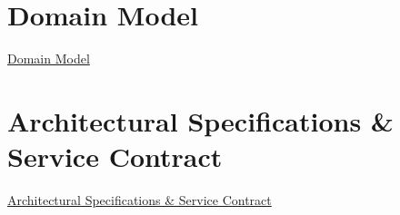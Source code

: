 \documentclass[12pt]{article}
\begin{document}
\section{Domain Model}
    \href{https://github.com/COS301-SE-2025/Marito/blob/main/Documentation/Domain%20Model/domain_model_V1.2.0.jpg}{Domain Model}

\section{Architectural Specifications \& Service Contract}
    \href{https://github.com/COS301-SE-2025/Marito/blob/main/Documentation/System%20Requirements/Architectural_Specifications_v4.pdf}{Architectural Specifications \& Service Contract}
\end{document}
